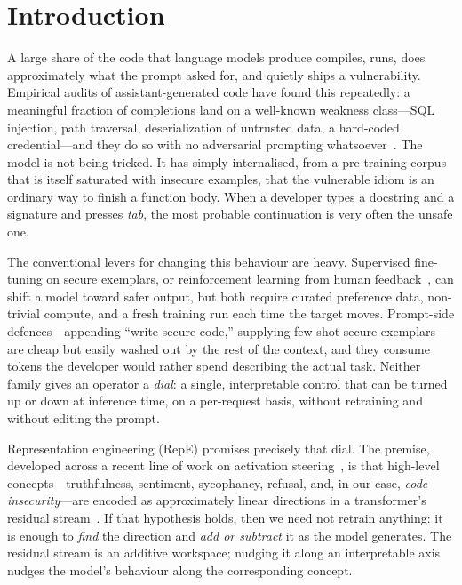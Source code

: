 \documentclass[11pt,a4paper]{article}
\begin{document}
\section{Introduction}
\label{sec:intro}

A large share of the code that language models produce compiles, runs, does approximately what the prompt asked for, and quietly ships a vulnerability. Empirical audits of assistant-generated code have found this repeatedly: a meaningful fraction of completions land on a well-known weakness class---SQL injection, path traversal, deserialization of untrusted data, a hard-coded credential---and they do so with no adversarial prompting whatsoever~\cite{pearce2022asleep}. The model is not being tricked. It has simply internalised, from a pre-training corpus that is itself saturated with insecure examples, that the vulnerable idiom is an ordinary way to finish a function body. When a developer types a docstring and a signature and presses \emph{tab}, the most probable continuation is very often the unsafe one.

The conventional levers for changing this behaviour are heavy. Supervised fine-tuning on secure exemplars, or reinforcement learning from human feedback~\cite{ouyang2022instructgpt}, can shift a model toward safer output, but both require curated preference data, non-trivial compute, and a fresh training run each time the target moves. Prompt-side defences---appending ``write secure code,'' supplying few-shot secure exemplars---are cheap but easily washed out by the rest of the context, and they consume tokens the developer would rather spend describing the actual task. Neither family gives an operator a \emph{dial}: a single, interpretable control that can be turned up or down at inference time, on a per-request basis, without retraining and without editing the prompt.

Representation engineering (RepE) promises precisely that dial. The premise, developed across a recent line of work on activation steering~\cite{zou2023repe, turner2023actadd, rimsky2024caa}, is that high-level concepts---truthfulness, sentiment, sycophancy, refusal, and, in our case, \emph{code insecurity}---are encoded as approximately linear directions in a transformer's residual stream~\cite{elhage2021mathematical}. If that hypothesis holds, then we need not retrain anything: it is enough to \emph{find} the direction and \emph{add or subtract} it as the model generates. The residual stream is an additive workspace; nudging it along an interpretable axis nudges the model's behaviour along the corresponding concept.
\end{document}
